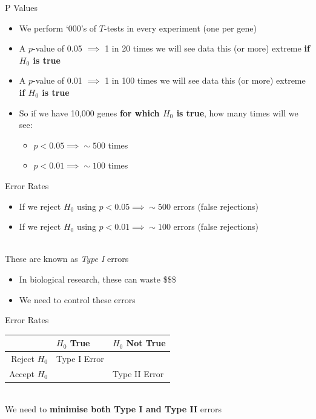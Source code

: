 \documentclass[aspectratio=169,11pt]{beamer}
\begin{document}
\begin{frame}{P Values}

	\begin{itemize}
		\item We perform `000's of $T$-tests in every experiment (one per gene)
		\item A $p$-value of 0.05 $\implies$ 1 in 20 times we will see data this (or more) extreme \textbf{if $H_0$ is true}
		\item A $p$-value of 0.01 $\implies$ 1 in 100 times we will see data this (or more) extreme \textbf{if $H_0$ is true}
		\item So if we have 10,000 genes \textbf{for which $H_0$ is true}, how many times will we see:
		\begin{itemize}
			\item $p < 0.05 \implies \sim500$ times
			\item $p < 0.01 \implies \sim100$ times
		\end{itemize}
	\end{itemize}

\end{frame}

\begin{frame}{Error Rates}

	\begin{itemize}
		\item If we reject $H_0$ using $p < 0.05 \implies \sim500$ errors (false rejections)
		\item If we reject $H_0$ using $p < 0.01 \implies \sim100$ errors (false rejections)
	\end{itemize}
	
	~\\[3mm]
	These are known as \textit{Type I} errors
	
	\begin{itemize}
		\item In biological research, these can waste \$\$\$
		\item We need to control these errors
	\end{itemize}

\end{frame}

\begin{frame}{Error Rates}

	\begin{center}
		\begin{tabular}{r|l|l}
		\toprule
			& $H_0$ True & $H_0$ Not True \\
		\midrule
		Reject $H_0$ & Type I Error & \checkmark\\
		\midrule
		Accept $H_0$ & \checkmark & Type II Error \\
		\bottomrule
		\end{tabular}	
	\end{center}

~\\[3mm]
We need to \textbf{minimise both Type I and Type II} errors 

\end{frame}
\end{document}
